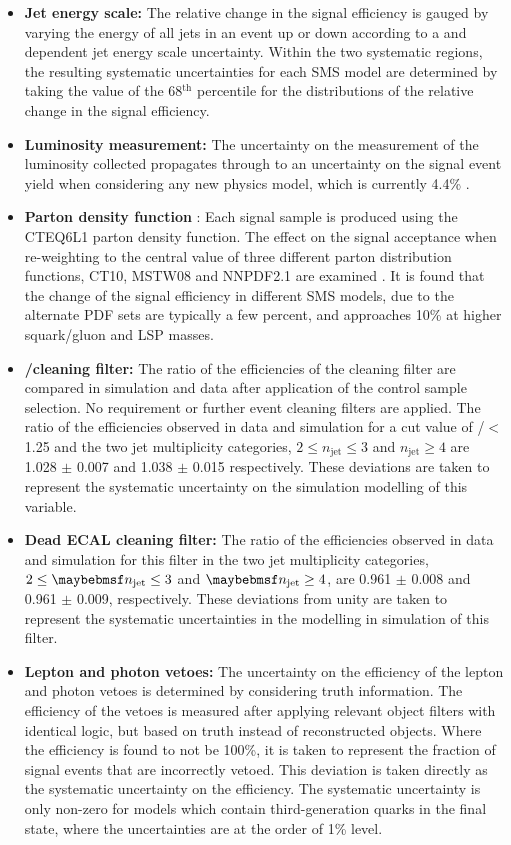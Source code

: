 \begin{itemize}
\item[]\textbf{Jet energy scale:} 
The relative change in the signal efficiency is gauged by varying the energy of all jets in an event up or down according to a \pt and \eta dependent jet energy scale uncertainty. Within the two systematic regions, the resulting systematic uncertainties for each \ac{SMS} model are determined by taking the value of the 68$^{\text{th}}$ percentile for the distributions of the relative change in the signal efficiency.
\item[]\textbf{Luminosity measurement:} 
The uncertainty on the measurement of the luminosity collected propagates through to an uncertainty on the signal event yield when considering any new physics model, which is currently 4.4\% \cite{CMS-PAS-LUM-12-001}.
\item[]\textbf{Parton density function} :
Each signal sample is produced using the CTEQ6L1 parton density function. The effect on the signal acceptance when re-weighting to the central value of three different parton distribution functions, CT10, MSTW08 and NNPDF2.1 are examined \cite{Botje:2011sn}. It is found that the change of the signal efficiency in different \ac{SMS} models, due to the alternate PDF sets are typically a few percent, and approaches 10\% at higher squark/gluon and \ac{LSP} masses.
\item[]\textbf{\mht/\met cleaning filter:} 
The ratio of the efficiencies of the cleaning filter are compared in simulation and data after application of the \mupjets control sample selection. No \alphat requirement or further event cleaning filters are applied. The ratio of the efficiencies observed in data and simulation for a cut value of \mht/\met $<$ 1.25 and the two jet multiplicity categories, $2 \leq n_{\text{jet}} \leq 3$ and $n_{\text{jet}} \geq 4$ are 1.028 $\pm$ 0.007 and 1.038 $\pm$ 0.015 respectively. These deviations are taken to represent the systematic uncertainty on the simulation modelling of this variable.
\item[]\textbf{Dead ECAL cleaning filter:} 
The ratio of the efficiencies observed in data and simulation for this filter in the two jet multiplicity categories, $2 \leq \njet \leq 3$ and $\njet \geq 4$, are 0.961 $\pm$ 0.008 and 0.961 $\pm$ 0.009, respectively. These deviations from unity are taken to represent the systematic uncertainties in the modelling in simulation of this filter.
\item[]\textbf{Lepton and photon vetoes:} 
The uncertainty on the efficiency of the lepton and photon vetoes is determined by considering truth information. The efficiency of the vetoes is measured after applying relevant object filters with identical logic, but based on truth instead of reconstructed objects. Where the efficiency is found to not be 100\%, it is taken to represent the fraction of signal events that are incorrectly vetoed. This deviation is taken directly as the systematic uncertainty on the efficiency. The systematic uncertainty is only non-zero for models which contain third-generation quarks in the final state, where the uncertainties are at the order of 1\% level.

\end{itemize}
